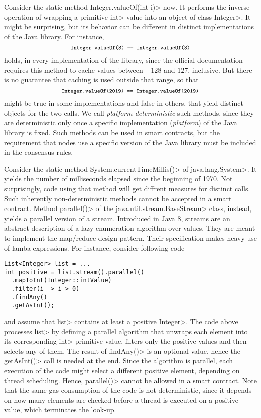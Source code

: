 Consider the static method \<Integer.valueOf(int i)> now. It performs the inverse operation of wrapping
a primitive \<int> value into an object of class \<Integer>. It might be surprising, but its behavior
can be different in distinct implementations of the Java library. For instance,
\[
\<Integer.valueOf(3) == Integer.valueOf(3)>
\]
holds, in every implementation of the library, since the official documentation requires this method
to cache values between $-128$ and $127$, inclusive. But there is no guarantee that caching is
used outside that range, so that
\[
\<Integer.valueOf(2019) == Integer.valueOf(2019)>
\]
might be true in some implementations and false in others, that yield distinct objects for the two calls.
We call \emph{platform deterministic} such methods, since they are deterministic only once a specific
implementation (\emph{platform}) of the Java library is fixed. Such methods can be used in smart contracts,
but the requirement that nodes use a specific version of the Java library must be included
in the consensus rules.

Consider the static method \<System.currentTimeMillis()> of \<java.lang.System>.
It yields the number of milliseconds elapsed since the beginning of 1970.
Not surprisingly, code using that method will get diffrent measures for distinct calls.
Such inherently non-deterministic methods cannot be accepted in a smart contract.
Method \<parallel()> of the \<java.util.stream.BaseStream> class, instead,
yields a parallel version of a stream. Introduced in Java 8, streams are
an abstract description of a lazy enumeration algorithm over values.
They are meant to implement the map/reduce design pattern. Their specification
makes heavy use of lamba expressions. For instance, consider following code
%
\begin{verbatim}
List<Integer> list = ...
int positive = list.stream().parallel()
  .mapToInt(Integer::intValue)
  .filter(i -> i > 0)
  .findAny()
  .getAsInt();
\end{verbatim}
%
and assume that \<list> contains at least a positive \<Integer>.
The code above processes \<list> by defining a parallel algorithm
that unwraps each element into its corresponding \<int> primitive value,
filters only the positive values and then selects any of them.
The result of \<findAny()> is an optional value, hence the
\<getAsInt()> call is needed at the end. Since the algorithm is
parallel, each execution of the code might select a different
positive element, depending on thread scheduling. Hence, \<parallel()>
cannot be allowed in a smart contract. Note that the same gas consumption
of the code is not deterministic, since it depends on how many elements
are checked before a thread is executed on a positive value, which terminates
the look-up.

